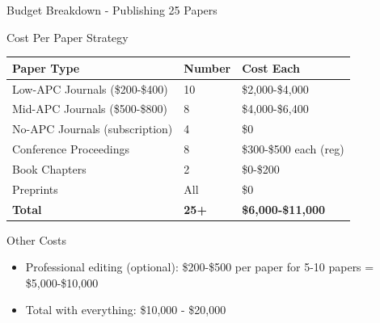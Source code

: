 \documentclass[11pt]{beamer}
\begin{document}
	\begin{frame}{Budget Breakdown - Publishing 25 Papers}
		\scriptsize
		\begin{block}{Cost Per Paper Strategy}
			\centering
			\begin{tabular}{|p{4cm}|p{3cm}|p{3cm}|}
				\hline
				\textbf{Paper Type} & \textbf{Number} & \textbf{Cost Each} \\
				\hline
				Low-APC Journals (\$200-\$400) & 10 & \$2,000-\$4,000 \\
				\hline
				Mid-APC Journals (\$500-\$800) & 8 & \$4,000-\$6,400 \\
				\hline
				No-APC Journals (subscription) & 4 & \$0 \\
				\hline
				Conference Proceedings & 8 & \$300-\$500 each (reg) \\
				\hline
				Book Chapters & 2 & \$0-\$200 \\
				\hline
				Preprints & All & \$0 \\
				\hline
				\textbf{Total} & \textbf{25+} & \textbf{\$6,000-\$11,000} \\
				\hline
			\end{tabular}
		\end{block}
		\begin{block}{Other Costs}
			\begin{itemize}
				\item Professional editing (optional): \$200-\$500 per paper for 5-10 papers = \$5,000-\$10,000
				\item Total with everything: \$10,000 - \$20,000
			\end{itemize}
		\end{block}
	\end{frame}
	
\end{document}
